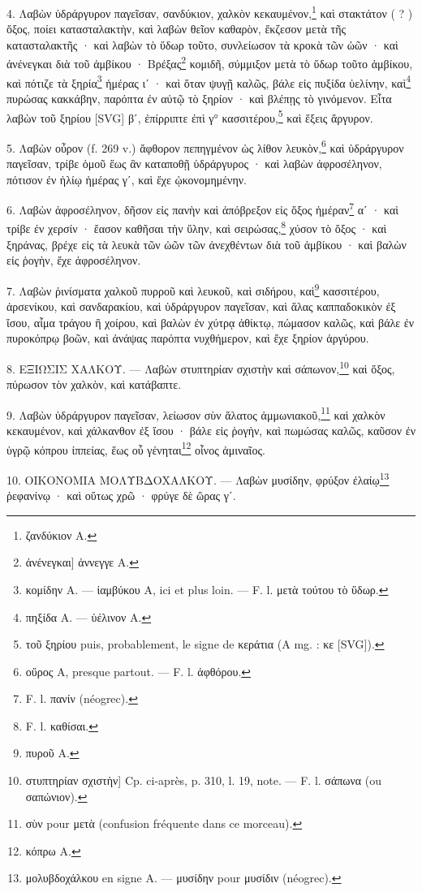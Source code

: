 \documentclass[a4paper, 11pt, oneside, polutonikogreek, french]{article}
\begin{document}
4. Λαβὼν ὑδράργυρον παγεῖσαν, σανδύκιον, χαλκὸν κεκαυμένον,\footnote{ζανδύκιον A.} καὶ στακτάτον ( ? ) ὄξος, ποίει κατασταλακτὴν, καὶ λαβὼν θεῖον καθαρὸν, ἔκζεσον μετὰ τῆς κατασταλακτῆς · καὶ λαβὼν τὸ ὕδωρ τοῦτο, συνλείωσον τὰ κροκὰ τῶν ὠῶν · καὶ ἀνένεγκαι διὰ τοῦ ἀμβίκου · Βρέξας\footnote{ἀνένεγκαι] ἀννεγγε A.} κομιδῆ, σύμμιξον μετὰ τὸ ὕδωρ τοῦτο ἀμβίκου, καὶ πότιζε τὰ ξηρία\footnote{κομίδην A. --- ἰαμβύκου A, ici et plus loin. --- F. l. μετὰ τούτου τὸ ὕδωρ.} ἡμέρας ιʹ · καὶ ὅταν ψυγῇ καλῶς, βάλε εἰς πυξίδα ὑελίνην, καὶ\footnote{πηξίδα A. --- ὑέλινον A.} πυρώσας κακκάβην, παρόπτα ἐν αὐτῷ τὸ ξηρίον · καὶ βλέπῃς τὸ γινόμενον. Εἶτα λαβὼν τοῦ ξηρίου [SVG] βʹ, ἐπίρριπτε ἐπὶ γ° κασσιτέρου,\footnote{τοῦ ξηρίου puis, probablement, le signe de κεράτια (A mg. : κε [SVG]).} καὶ ἕξεις ἄργυρον.

5. Λαβὼν οὖρον (f. 269 v.) ἄφθορον πεπηγμένον ὡς λίθον λευκὸν,\footnote{οὔρος A, presque partout. --- F. l. ἀφθόρου.} καὶ ὑδράργυρον παγεῖσαν, τρίβε ὁμοῦ ἕως ἂν καταποθῇ ὑδράργυρος · καὶ λαβὼν ἀφροσέληνον, πότισον ἐν ἡλίῳ ἡμέρας γʹ, καὶ ἔχε ᾠκονομημένην.

6. Λαβὼν ἀφροσέληνον, δῆσον εἰς πανὴν καὶ ἀπόβρεξον εἰς ὄξος ἡμέραν\footnote{F. l. πανίν (néogrec).} αʹ · καὶ τρίβε ἐν χερσίν · ἔασον καθῆσαι τὴν ὕλην, καὶ σειρώσας,\footnote{F. l. καθίσαι.} χύσον τὸ ὄξος · καὶ ξηράνας, βρέχε εἰς τὰ λευκὰ τῶν ὠῶν τῶν ἀνεχθέντων διὰ τοῦ ἀμβίκου · καὶ βαλὼν εἰς ῥογὴν, ἔχε ἀφροσέληνον.

7. Λαβὼν ῥινίσματα χαλκοῦ πυρροῦ καὶ λευκοῦ, καὶ σιδήρου, καὶ\footnote{πυροῦ A.} κασσιτέρου, ἀρσενίκου, καὶ σανδαρακίου, καὶ ὑδράργυρον παγεῖσαν, καὶ ἅλας καππαδοκικὸν ἐξ ἴσου, αἷμα τράγου ἢ χοίρου, καὶ βαλὼν ἐν χύτρᾳ ἀθίκτῳ, πώμασον καλῶς, καὶ βάλε ἐν πυροκόπρῳ βοῶν, καὶ ἀνάψας παρόπτα νυχθήμερον, καὶ ἔχε ξηρίον ἀργύρου.

8. ΕΞΙΩΣΙΣ ΧΑΛΚΟΥ. --- Λαβὼν στυπτηρίαν σχιστὴν καὶ σάπωνον,\footnote{στυπτηρίαν σχιστὴν] Cp. ci-après, p. 310, l. 19, note. --- F. l. σάπωνα (ou σαπώνιον).} καὶ ὄξος, πύρωσον τὸν χαλκὸν, καὶ κατάβαπτε.

9. Λαβὼν ὑδράργυρον παγεῖσαν, λείωσον σὺν ἅλατος ἀμμωνιακοῦ,\footnote{σὺν pour μετὰ (confusion fréquente dans ce morceau).} καὶ χαλκὸν κεκαυμένον, καὶ χάλκανθον ἐξ ἴσου · βάλε εἰς ῥογὴν, καὶ πωμώσας καλῶς, καῦσον ἐν ὑγρῷ κόπρου ίππείας, ἕως οὗ γένηται\footnote{κόπρω A.} οἶνος ἀμιναῖος.

10. ΟΙΚΟΝΟΜΙΑ ΜΟΛΥΒΔΟΧΑΛΚΟΥ. --- Λαβὼν μυσίδην, φρύξον ἐλαίῳ\footnote{μολυβδοχάλκου en signe A. --- μυσίδην pour μυσίδιν (néogrec).} ῥεφανίνῳ · καὶ οὕτως χρῶ · φρύγε δὲ ὥρας γʹ.
\end{document}
